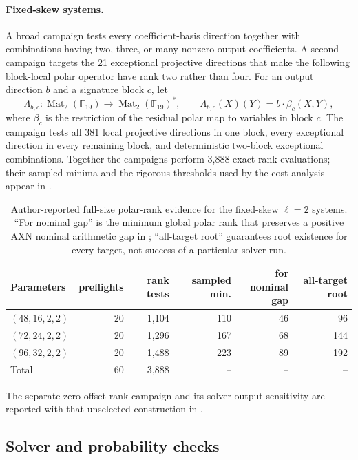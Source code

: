 \documentclass[11pt]{article}
\newcommand{\F}{\mathbb F}
\newcommand{\Mat}{\operatorname{Mat}}
\begin{document}
\paragraph{Fixed-skew systems.}
A broad campaign tests every coefficient-basis direction together with
combinations having two, three, or many nonzero output coefficients.  A second campaign targets
the 21 exceptional projective directions that make the following block-local
polar operator have rank two rather than four.  For an output direction $b$
and a signature block $c$, let
\[
 \Lambda_{b,c}:\Mat_2(\F_{19})\longrightarrow\Mat_2(\F_{19})^*,
 \qquad
 \Lambda_{b,c}(X)(Y)=b\cdot\beta_c(X,Y),
\]
where $\beta_c$ is the restriction of the residual polar map to variables in
block $c$.  The campaign tests all 381 local
projective directions in one block, every exceptional direction in every
remaining block, and deterministic two-block exceptional combinations.
Together the campaigns perform 3,888 exact rank evaluations; their sampled
minima and the rigorous thresholds used by the cost analysis appear in
.

\begin{table}[tbp]
\centering
\caption{Author-reported full-size polar-rank evidence for the fixed-skew
$\ell=2$ systems.
``For nominal gap'' is the minimum global polar rank that preserves a positive
AXN nominal arithmetic gap in ; ``all-target root'' guarantees root
existence for every target, not success of a particular solver run.}
\label{tab:fixed-skew-evidence}
\small
\setlength{\tabcolsep}{4.5pt}
\begin{tabular}{@{}l r r r r r@{}}
\toprule
Parameters & preflights & rank tests & sampled min. & \shortstack{for nominal\\gap} & all-target root\\
\midrule
$(48,16,2,2)$ & 20 & 1,104 & 110 & 46 & 96\\
$(72,24,2,2)$ & 20 & 1,296 & 167 & 68 & 144\\
$(96,32,2,2)$ & 20 & 1,488 & 223 & 89 & 192\\
\midrule
Total & 60 & 3,888 & -- & -- & --\\
\bottomrule
\end{tabular}
\end{table}

The separate zero-offset rank campaign and its solver-output sensitivity are
reported with that unselected construction in .

\subsection{Solver and probability checks}
\end{document}
